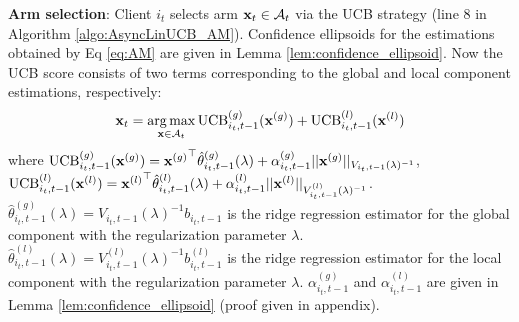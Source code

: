 
\noindent \textbf{Arm selection}:
Client $i_{t}$ selects arm $\mathbf{x}_{t} \in \mathcal{A}_{t}$ via the UCB strategy (line 8 in Algorithm \ref{algo:AsyncLinUCB_AM}). Confidence ellipsoids for the estimations obtained by Eq \eqref{eq:AM} are given in Lemma \ref{lem:confidence_ellipsoid}. Now the UCB score consists of two terms corresponding to the global and local component estimations, respectively:
\begin{equation}\label{eq:UCB_AM}
    \mathbf{x}_{t}=\operatorname*{arg\,max}_{\mathbf{x} \in \mathcal{A}_{t}}{\text{UCB}^{(g)}_{i_{t},t-1}({\mathbf{x}^{(g)}})+\text{UCB}^{(l)}_{i_{t},t-1}({\mathbf{x}^{(l)}})}
\end{equation}
where 
$\text{UCB}^{(g)}_{i_{t},t-1}({\mathbf{x}^{(g)}}) = {\mathbf{x}^{(g)}}^{\top}\hat{\theta}^{(g)}_{i_{t},t-1}(\lambda)+\alpha^{(g)}_{i_{t},t-1}||\mathbf{x}^{(g)}||_{V_{i_{t},t-1}(\lambda)^{-1}}$,
$\text{UCB}^{(l)}_{i_{t},t-1}({\mathbf{x}^{(l)}}) = {\mathbf{x}^{(l)}}^{\top}\hat{\theta}^{(l)}_{i_{t},t-1}(\lambda)+\alpha^{(l)}_{i_{t},t-1}||\mathbf{x}^{(l)}||_{V^{(l)}_{i_{t},t-1}(\lambda)^{-1}}$. $\hat{\theta}^{(g)}_{i_{t},t-1}(\lambda)=V_{i_{t},t-1}(\lambda)^{-1}b_{i_{t},t-1}$ is the ridge regression estimator for the global component with the regularization parameter $\lambda$. $\hat{\theta}^{(l)}_{i_{t},t-1}(\lambda)= V^{(l)}_{i_{t},t-1}(\lambda)^{-1}b^{(l)}_{i_{t},t-1}$ is the ridge regression estimator for the local component with the regularization parameter $\lambda$.
$\alpha^{(g)}_{i_{t},t-1}$ and $\alpha^{(l)}_{i_{t},t-1}$ are given in Lemma \ref{lem:confidence_ellipsoid} (proof given in appendix).

